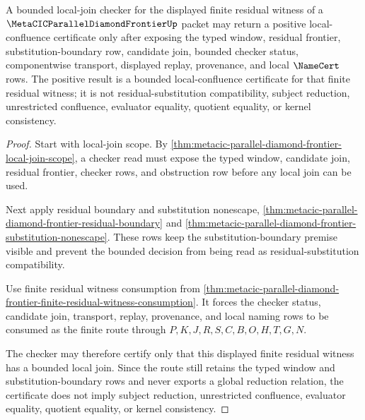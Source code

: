 \begin{theorem}
\label{thm:metacic-parallel-diamond-frontier-bounded-local-confluence-decision}
A bounded local-join checker for the displayed finite residual witness of a $\MetaCICParallelDiamondFrontierUp$ packet may return a positive local-confluence certificate only after exposing the typed window, residual frontier, substitution-boundary row, candidate join, bounded checker status, componentwise transport, displayed replay, provenance, and local $\NameCert$ rows. The positive result is a bounded local-confluence certificate for that finite residual witness; it is not residual-substitution compatibility, subject reduction, unrestricted confluence, evaluator equality, quotient equality, or kernel consistency.
\end{theorem}
\begin{proof}
Start with local-join scope. By \autoref{thm:metacic-parallel-diamond-frontier-local-join-scope}, a checker read must expose the typed window, candidate join, residual frontier, checker rows, and obstruction row before any local join can be used.

Next apply residual boundary and substitution nonescape, \autoref{thm:metacic-parallel-diamond-frontier-residual-boundary} and \autoref{thm:metacic-parallel-diamond-frontier-substitution-nonescape}. These rows keep the substitution-boundary premise visible and prevent the bounded decision from being read as residual-substitution compatibility.

Use finite residual witness consumption from \autoref{thm:metacic-parallel-diamond-frontier-finite-residual-witness-consumption}. It forces the checker status, candidate join, transport, replay, provenance, and local naming rows to be consumed as the finite route through $P,K,J,R,S,C,B,O,H,T,G,N$.

The checker may therefore certify only that this displayed finite residual witness has a bounded local join. Since the route still retains the typed window and substitution-boundary rows and never exports a global reduction relation, the certificate does not imply subject reduction, unrestricted confluence, evaluator equality, quotient equality, or kernel consistency.
\end{proof}

